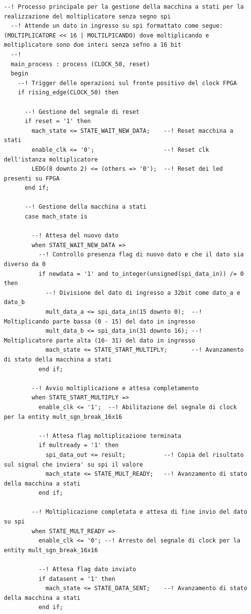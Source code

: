 \documentclass[titlepage]{report}
\begin{document}
\begin{lstlisting}[caption={Processo principale del moltiplicatore}, label={lst:mul16_process}]
  --! Processo principale per la gestione della macchina a stati per la realizzazione del moltiplicatore senza segno spi
  --! Attende un dato in ingresso su spi formattato come segue: (MOLTIPLICATORE << 16 | MOLTILPICANDO) dove moltiplicando e moltiplicatore sono due interi senza sefno a 16 bit
  --! 
  main_process : process (CLOCK_50, reset)
  begin
    --! Trigger delle operazioni sul fronte positivo del clock FPGA
    if rising_edge(CLOCK_50) then

      --! Gestione del segnale di reset
      if reset = '1' then
        mach_state <= STATE_WAIT_NEW_DATA;    --! Reset macchina a stati
        enable_clk <= '0';                    --! Reset clk dell'istanza moltiplicatore
        LEDG(8 downto 2) <= (others => '0');  --! Reset dei led presenti su FPGA
      end if;

      --! Gestione della macchina a stati
      case mach_state is

        --! Attesa del nuovo dato
        when STATE_WAIT_NEW_DATA =>
          --! Controllo presenza flag di nuovo dato e che il dato sia diverso da 0
          if newdata = '1' and to_integer(unsigned(spi_data_in)) /= 0  then
            --! Divisione del dato di ingresso a 32bit come dato_a e dato_b
            mult_data_a <= spi_data_in(15 downto 0);  --! Moltiplicando parte bassa (0 - 15) del dato in ingresso
            mult_data_b <= spi_data_in(31 downto 16); --! Moltiplicatore parte alta (16- 31) del dato in ingresso
            mach_state <= STATE_START_MULTIPLY;       --! Avanzamento di stato della macchina a stati
          end if;

        --! Avvio moltiplicazione e attesa completamento
        when STATE_START_MULTIPLY =>
          enable_clk <= '1';  --! Abilitazione del segnale di clock per la entity mult_sgn_break_16x16

          --! Attesa flag moltiplicazione terminata
          if multready = '1' then
            spi_data_out <= result;           --! Copia del risultato sul signal che inviera' su spi il valore
            mach_state <= STATE_MULT_READY;   --! Avanzamento di stato della macchina a stati
          end if;

        --! Moltiplicazione completata e attesa di fine invio del dato su spi
        when STATE_MULT_READY =>
          enable_clk <= '0'; --! Arresto del segnale di clock per la entity mult_sgn_break_16x16
          
          --! Attesa flag dato inviato
          if datasent = '1' then
            mach_state <= STATE_DATA_SENT;    --! Avanzamento di stato della macchina a stati
          end if;


\end{lstlisting}
\end{document}
